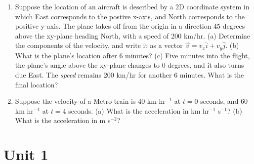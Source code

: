 \documentclass{article}
\begin{document}
\begin{enumerate}
\item Suppose the location of an aircraft is described by a 2D coordinate system in which East corresponds to the postive x-axis, and North corresponds to the positive y-axis.  The plane takes off from the origin in a direction 45 degrees above the xy-plane heading North, with a speed of 200 km/hr.  (a) Determine the components of the velocity, and write it as a vector $\vec{v} = v_x \hat{i} + v_y \hat{j}$.  (b) What is the plane's location after 6 minutes?  (c) Five minutes into the flight, the plane's angle above the xy-plane changes to 0 degrees, and it also turns due East. The \textit{speed} remains 200 km/hr for another 6 minutes.  What is the final location? \\ \vspace{4cm}

\item Suppose the velocity of a Metro train is 40 km hr$^{-1}$ at $t=0$ seconds, and 60 km hr$^{-1}$ at $t=4$ seconds. (a) What is the acceleration in km hr$^{-1}$ s$^{-1}$? (b) What is the acceleration in m s$^{-2}$? \\ \vspace{2cm}

\end{enumerate}

\section{Unit 1}
\end{document}
